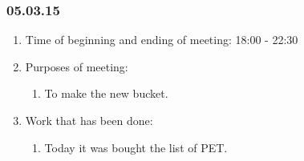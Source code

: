 \subsubsection{05.03.15}

\begin{enumerate}
	\item Time of beginning and ending of meeting:
	18:00 - 22:30
	\item Purposes of meeting:
	\begin{enumerate}
		\item To make the new bucket.
			  
    \end{enumerate}
   
	\item Work that has been done:
	\begin{enumerate}
		 \item Today it was bought the list of PET.
		 

\end{enumerate}
\end{enumerate}
